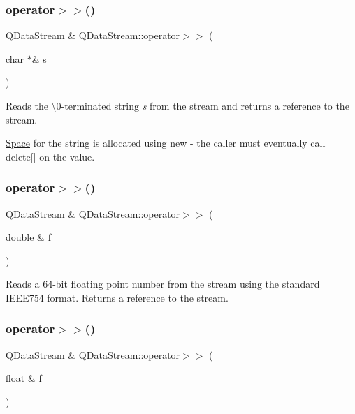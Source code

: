 \subsubsection{\texorpdfstring{operator$>$$>$()}{operator>>()}\hspace{0.1cm}{\footnotesize\ttfamily [1/11]}}
{\footnotesize\ttfamily \mbox{\hyperlink{class_q_data_stream}{Q\+Data\+Stream}} \& Q\+Data\+Stream\+::operator$>$$>$ (\begin{DoxyParamCaption}\item[{char $\ast$\&}]{s }\end{DoxyParamCaption})}

Reads the \textquotesingle{}\textbackslash{}0\textquotesingle{}-\/terminated string {\itshape s} from the stream and returns a reference to the stream.

\mbox{\hyperlink{class_space}{Space}} for the string is allocated using {\ttfamily new} -\/ the caller must eventually call delete\mbox{[}\mbox{]} on the value. \mbox{\label{class_q_data_stream_a104e26e0d013188f9cc91d232d70d7f0}} 
\subsubsection{\texorpdfstring{operator$>$$>$()}{operator>>()}\hspace{0.1cm}{\footnotesize\ttfamily [2/11]}}
{\footnotesize\ttfamily \mbox{\hyperlink{class_q_data_stream}{Q\+Data\+Stream}} \& Q\+Data\+Stream\+::operator$>$$>$ (\begin{DoxyParamCaption}\item[{double \&}]{f }\end{DoxyParamCaption})}

Reads a 64-\/bit floating point number from the stream using the standard I\+E\+E\+E754 format. Returns a reference to the stream. \mbox{\label{class_q_data_stream_a91a008aea3483414151f12f5c7090d28}} 
\subsubsection{\texorpdfstring{operator$>$$>$()}{operator>>()}\hspace{0.1cm}{\footnotesize\ttfamily [3/11]}}
{\footnotesize\ttfamily \mbox{\hyperlink{class_q_data_stream}{Q\+Data\+Stream}} \& Q\+Data\+Stream\+::operator$>$$>$ (\begin{DoxyParamCaption}\item[{float \&}]{f }\end{DoxyParamCaption})}


